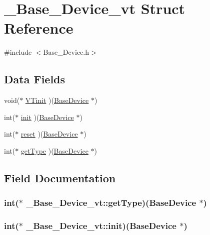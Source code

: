 \hypertarget{struct___base___device__vt}{\section{\-\_\-\-Base\-\_\-\-Device\-\_\-vt Struct Reference}
\label{struct___base___device__vt}
}


{\ttfamily \#include $<$Base\-\_\-\-Device.\-h$>$}

\subsection*{Data Fields}
\begin{DoxyCompactItemize}
\item 
void($\ast$ \hyperlink{struct___base___device__vt_a01a71122bd9d5698a43fc7ea8b368c01}{V\-Tinit} )(\hyperlink{_base___device_8h_a35346bbd80cb3a10fa241ce386fb7e79}{Base\-Device} $\ast$)
\item 
int($\ast$ \hyperlink{struct___base___device__vt_a0387c5335c5e1d745a78503687fd0e51}{init} )(\hyperlink{_base___device_8h_a35346bbd80cb3a10fa241ce386fb7e79}{Base\-Device} $\ast$)
\item 
int($\ast$ \hyperlink{struct___base___device__vt_abb98aa8063ef90b5b8ac02eb060e4e68}{reset} )(\hyperlink{_base___device_8h_a35346bbd80cb3a10fa241ce386fb7e79}{Base\-Device} $\ast$)
\item 
int($\ast$ \hyperlink{struct___base___device__vt_a8471528375ff87bfc682e2baf57fa6c6}{get\-Type} )(\hyperlink{_base___device_8h_a35346bbd80cb3a10fa241ce386fb7e79}{Base\-Device} $\ast$)
\end{DoxyCompactItemize}


\subsection{Field Documentation}
\hypertarget{struct___base___device__vt_a8471528375ff87bfc682e2baf57fa6c6}{
\subsubsection[{get\-Type}]{\setlength{\rightskip}{0pt plus 5cm}int($\ast$ \-\_\-\-Base\-\_\-\-Device\-\_\-vt\-::get\-Type)({\bf Base\-Device} $\ast$)}}\label{struct___base___device__vt_a8471528375ff87bfc682e2baf57fa6c6}
\hypertarget{struct___base___device__vt_a0387c5335c5e1d745a78503687fd0e51}{
\subsubsection[{init}]{\setlength{\rightskip}{0pt plus 5cm}int($\ast$ \-\_\-\-Base\-\_\-\-Device\-\_\-vt\-::init)({\bf Base\-Device} $\ast$)}}\label{struct___base___device__vt_a0387c5335c5e1d745a78503687fd0e51}


